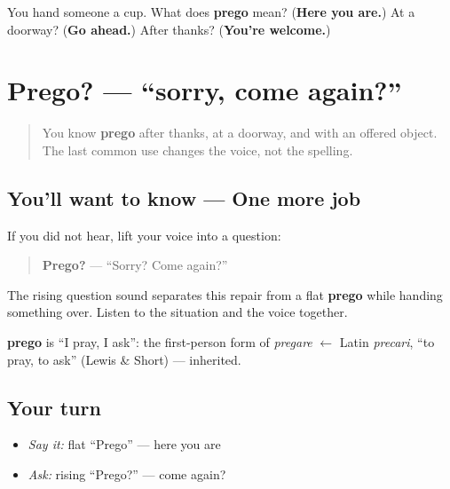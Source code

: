 \begin{tcolorbox}[breakable,colback=teal!4,colframe=teal!35!black,title={Before you move on}]
You hand someone a cup. What does \textbf{prego} mean? (\textbf{Here you are.}) At a doorway? (\textbf{Go ahead.}) After thanks? (\textbf{You're welcome.})
\end{tcolorbox}
\section[Prego? — come again?]{Prego? — \textquotedblleft{}sorry, come again?\textquotedblright{}}

\label{lesson:IT-C02-prego-come-again}



\begin{quote}
You know \textbf{prego} after thanks, at a doorway, and with an offered object. The last common use changes the voice, not the spelling.
\end{quote}

\subsection*{You'll want to know — One more job}
If you did not hear, lift your voice into a question:

\begin{quote}
\textbf{Prego?} — \textquotedblleft{}Sorry? Come again?\textquotedblright{}
\end{quote}

The rising question sound separates this repair from a flat \textbf{prego} while handing something over. Listen to the situation and the voice together.

\begin{cousinweb}
\textbf{prego} is \textquotedblleft{}I pray, I ask\textquotedblright{}: the first-person form of \emph{pregare} $\leftarrow$ Latin \emph{precari}, \textquotedblleft{}to pray, to ask\textquotedblright{} (Lewis \& Short) — inherited.
\end{cousinweb}

\subsection*{Your turn}
\begin{itemize}
\raggedright
  \item \emph{Say it:} flat \textquotedblleft{}Prego\textquotedblright{} — here you are
  \item \emph{Ask:} rising \textquotedblleft{}Prego?\textquotedblright{} — come again?
\end{itemize}

